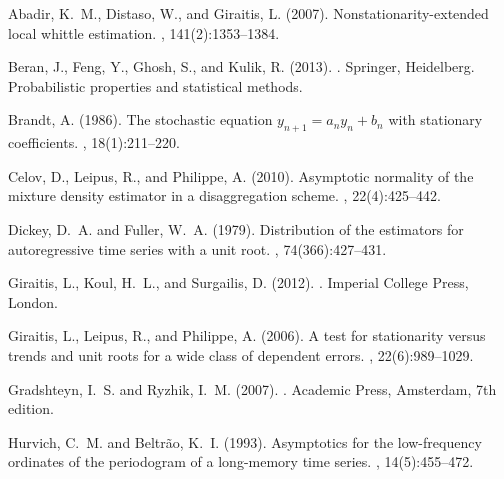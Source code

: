 \documentclass[10pt,a4paper]{amsart}
\numberwithin{equation}{section}
\begin{document}

%
\begin{thebibliography}{}

Abadir, K.~M., Distaso, W., and Giraitis, L. (2007).
\newblock Nonstationarity-extended local whittle estimation.
, 141(2):1353--1384.

Beran, J., Feng, Y., Ghosh, S., and Kulik, R. (2013).
.
\newblock Springer, Heidelberg.
\newblock Probabilistic properties and statistical methods.

Brandt, A. (1986).
\newblock The stochastic equation $y_{n+1} = a_n y_n + b_n$ with stationary
  coefficients.
, 18(1):211--220.

Celov, D., Leipus, R., and Philippe, A. (2010).
\newblock Asymptotic normality of the mixture density estimator in a
  disaggregation scheme.
, 22(4):425--442.

Dickey, D.~A. and Fuller, W.~A. (1979).
\newblock Distribution of the estimators for autoregressive time series with a
  unit root.
,
  74(366):427--431.

Giraitis, L., Koul, H.~L., and Surgailis, D. (2012).
.
\newblock Imperial College Press, London.

Giraitis, L., Leipus, R., and Philippe, A. (2006).
\newblock A test for stationarity versus trends and unit roots for a wide class
  of dependent errors.
, 22(6):989--1029.

Gradshteyn, I.~S. and Ryzhik, I.~M. (2007).
.
\newblock Academic Press, Amsterdam, 7th edition.

Hurvich, C.~M. and Beltr\~{a}o, K.~I. (1993).
\newblock Asymptotics for the low-frequency ordinates of the periodogram of a
  long-memory time series.
, 14(5):455--472.


\end{thebibliography}
\end{document}
